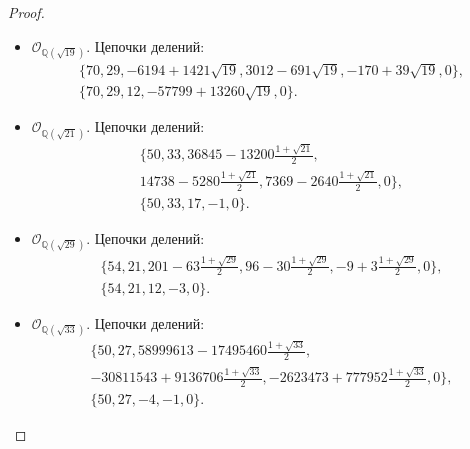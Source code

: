\documentclass[_00_dissertation.tex]{subfiles}
\begin{document}
\begin{proof}
\begin{itemize}
        \item $\mathcal{O}_{\mathbb{Q}(\sqrt{19})}$.
        Цепочки делений:
        \begin{equation*}
            \begin{split}
                \{70, 29, -6194+1421\sqrt{19}, 3012-691\sqrt{19}, -170+39\sqrt{19}, 0\},\\
                \{70, 29, 12, -57799+13260\sqrt{19}, 0\}.
            \end{split}
        \end{equation*}
    
        \item $\mathcal{O}_{\mathbb{Q}(\sqrt{21})}$.
        Цепочки делений:
        \begin{equation*}
            \begin{split}
                \{50, 33, 36845-13200\frac{1+\sqrt{21}}{2},\\
                    14738-5280\frac{1+\sqrt{21}}{2}, 7369-2640\frac{1+\sqrt{21}}{2}, 0\},\\
                \{50, 33, 17, -1, 0\}.
            \end{split}
        \end{equation*}
    
        \item $\mathcal{O}_{\mathbb{Q}(\sqrt{29})}$.
        Цепочки делений:
        \begin{equation*}
            \begin{split}
                \{54, 21, 201-63\frac{1+\sqrt{29}}{2}, 96-30\frac{1+\sqrt{29}}{2}, -9+3\frac{1+\sqrt{29}}{2}, 0\},\\
                \{54, 21, 12, -3, 0\}.
            \end{split}
        \end{equation*}
    
        \item $\mathcal{O}_{\mathbb{Q}(\sqrt{33})}$.
        Цепочки делений:
        \begin{equation*}
            \begin{split}
                \{50, 27, 58999613-17495460\frac{1+\sqrt{33}}{2},\\
                    -30811543+9136706\frac{1+\sqrt{33}}{2}, -2623473+777952\frac{1+\sqrt{33}}{2}, 0\},\\
                \{50, 27, -4, -1, 0\}.
            \end{split}
        \end{equation*}
    

\end{itemize}
\end{proof}
\end{document}
